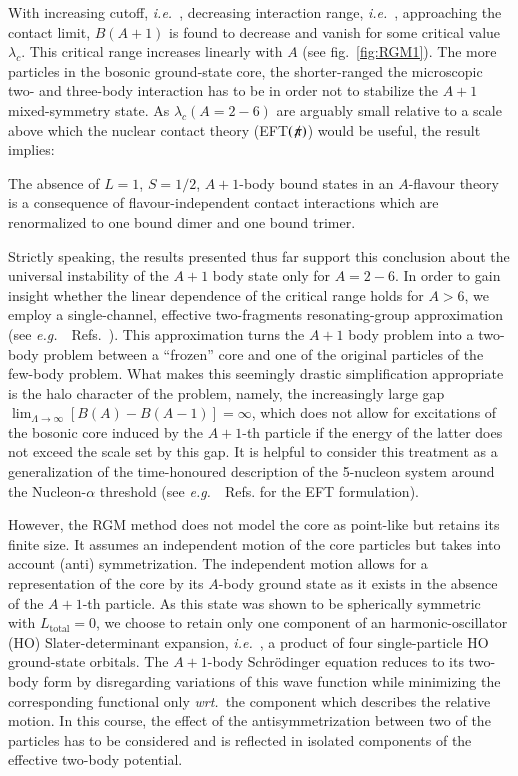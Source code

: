 \documentclass[preprint,12pt]{elsarticle}
\newcommand{\lc}{\ensuremath{\lambda_c}}
\newcommand{\wrt}{\textit{wrt.}~}
\newcommand{\eg}{\textit{e.g.}~}
\newcommand{\ie}{\textit{i.e.}~}
\newcommand{\eftnopi}{\mbox{EFT$(\not \! \pi)$}}
\newcommand{\figref}[1]{fig.~\ref{#1}}
\begin{document}
With increasing cutoff, \ie, decreasing interaction range, \ie, approaching the 
contact limit, $B(A+1)$ is found to decrease
and vanish for some critical value $\lc$. This critical
range increases linearly with $A$ (see \figref{fig:RGM1}).
The more particles in the bosonic ground-state core, the shorter-ranged the 
microscopic two- and three-body interaction
has to be in order not to stabilize the $A+1$ mixed-symmetry state.
As $\lc(A=2-6)$ are arguably small relative to a scale above
which the nuclear contact theory (\eftnopi) would
be useful, the result implies:

The absence of $L=1$, $S=1/2$, $A+1$-body bound states in an $A$-flavour theory
is a consequence of flavour-independent contact interactions which are
renormalized to one bound dimer and one bound trimer. 

Strictly speaking, the results presented thus far support this conclusion about the
universal instability of the $A+1$
body state only for $A=2-6$. In order to gain insight whether the linear
dependence of the critical range holds for
$A>6$, we employ a single-channel, effective two-fragments resonating-group
approximation (see \eg~Refs.~\cite{PhysRev.52.1083,Naidon_2016}). This approximation
turns the $A+1$ body problem into a two-body problem between a ``frozen'' 
core and one of the original particles of
the few-body problem. What makes this seemingly drastic simplification 
appropriate is the halo character of the problem,
namely, the increasingly large gap
$\lim_{\Lambda\to\infty}\left[B(A)-B(A-1)\right]=\infty$, which does not
allow for excitations of the bosonic core induced by the $A+1$-th particle if the
energy of the latter
does not exceed the scale set by this gap. It is helpful to consider this
treatment as a generalization of the
time-honoured description of the 5-nucleon system around the Nucleon-$\alpha$
threshold (see \eg~Refs.\cite{Bertulani:2002sz,Brown:2013zla} for the EFT formulation).

However, the RGM method does not model the core as point-like but retains
its finite size. It assumes
an independent motion of the core particles but takes into account (anti)
symmetrization.
The independent motion allows for a representation of the core by
its $A$-body ground state as it exists in the absence of the $A+1$-th particle.
As this state was shown
to be spherically symmetric with $L_\text{total}=0$, we choose to retain only one
component of an harmonic-oscillator (HO)
Slater-determinant expansion, \ie, a product of four single-particle HO
ground-state orbitals.
The $A+1$-body Schr\"odinger equation reduces to its two-body form by disregarding
variations of this wave function
while minimizing the corresponding functional only \wrt the component
which describes the relative motion.
In this course, the effect of the antisymmetrization between two of
the particles has to be considered and is reflected
in isolated components of the effective two-body potential.
\end{document}
